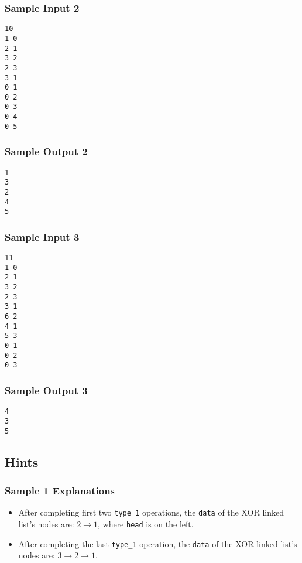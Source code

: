 \begin{multicols}{2}
\subsubsection{Sample Input 2}\label{sample-input-2}
\begin{verbatim}
10
1 0
2 1
3 2
2 3
3 1
0 1
0 2
0 3
0 4
0 5
\end{verbatim}

\columnbreak

\subsubsection{Sample Output 2}\label{sample-output-2}
\begin{verbatim}
1 
3 
2 
4 
5
\end{verbatim}
\end{multicols}

\newpage

\begin{multicols}{2}
\subsubsection{Sample Input 3}\label{sample-input-3}
\begin{verbatim}
11
1 0
2 1
3 2
2 3
3 1
6 2
4 1
5 3
0 1
0 2
0 3
\end{verbatim}
    
\columnbreak
    
\subsubsection{Sample Output 3}\label{sample-output-3}
\begin{verbatim}
4
3
5
\end{verbatim}
\end{multicols}

\subsection{Hints}\label{hints}

\subsubsection{Sample 1 Explanations}\label{sample-1-explanation}

\begin{itemize}
\item After completing first two \texttt{type\_1} operations, the \texttt{data} of the XOR linked list's nodes are: $2\rightarrow 1$, where \texttt{head} is on the left.
\item After completing the last \texttt{type\_1} operation, the \texttt{data} of the XOR linked list's nodes are: $3\rightarrow 2\rightarrow 1$.
\end{itemize}

